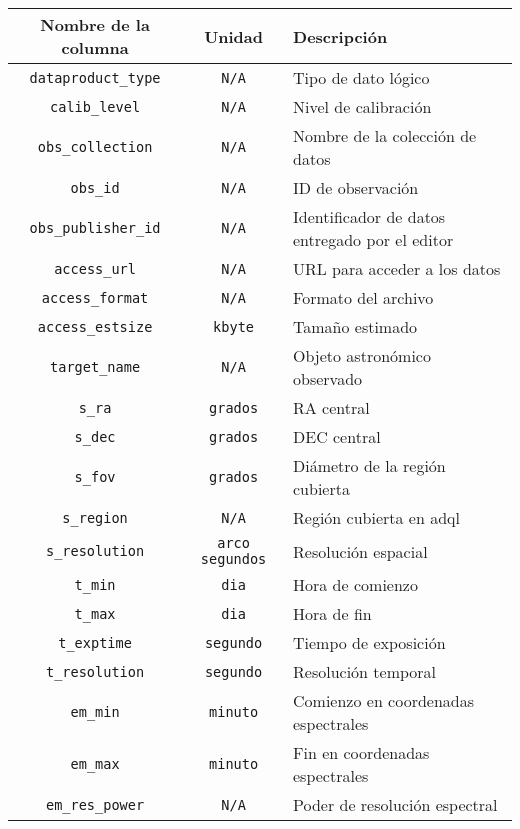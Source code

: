 \begin{table}[ht!]
	\centering
	\begin{tabular}{c|c|p{3in}}
		Nombre de la columna & Unidad & Descripción \\\hline\hline
		\verb;dataproduct_type; & \verb;N/A;           & Tipo de dato lógico \\
		\verb;calib_level;      & \verb;N/A;           & Nivel de calibración \\
		\verb;obs_collection;   & \verb;N/A;           & Nombre de la colección de datos \\
		\verb;obs_id;           & \verb;N/A;           & ID de observación \\
		\verb;obs_publisher_id; & \verb;N/A;           & Identificador de datos entregado por el editor \\
		\verb;access_url;       & \verb;N/A;           & URL para acceder a los datos \\
		\verb;access_format;    & \verb;N/A;           & Formato del archivo \\
		\verb;access_estsize;   & \verb;kbyte;         & Tamaño estimado \\
		\verb;target_name;      & \verb;N/A;           & Objeto astronómico observado \\
		\verb;s_ra;             & \verb;grados;        & RA central \\
		\verb;s_dec;            & \verb;grados;        & DEC central \\
		\verb;s_fov;            & \verb;grados;        & Diámetro de la región cubierta \\
		\verb;s_region;         & \verb;N/A;           & Región cubierta en \gls{adql} \\
		\verb;s_resolution;     & \verb;arco segundos; & Resolución espacial \\
		\verb;t_min;            & \verb;dia;           & Hora de comienzo \\
		\verb;t_max;            & \verb;dia;           & Hora de fin \\
		\verb;t_exptime;        & \verb;segundo;       & Tiempo de exposición \\
		\verb;t_resolution;     & \verb;segundo;       & Resolución temporal \\
		\verb;em_min;           & \verb;minuto;        & Comienzo en coordenadas espectrales \\
		\verb;em_max;           & \verb;minuto;        & Fin en coordenadas espectrales \\
		\verb;em_res_power;     & \verb;N/A;           & Poder de resolución espectral \\

\end{tabular}
\end{table}
